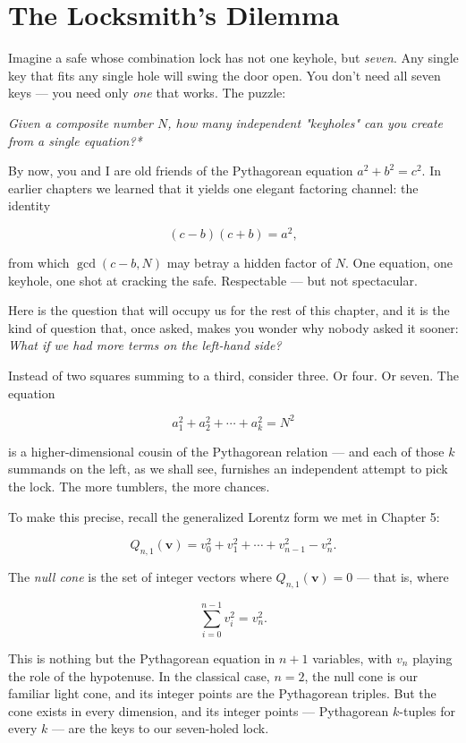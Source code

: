 \documentclass[11pt,openright,twoside]{book}
\renewenvironment{quotation}{%
  \par\vspace{8pt}%
  \begin{list}{}{%
    \setlength{\leftmargin}{2em}%
    \setlength{\rightmargin}{2em}%
  }\item[]\itshape\color{pullquote}%
}{%
  \end{list}%
  \par\vspace{8pt}%
}
\theoremstyle{definition}
\begin{document}
\bigskip


\section{The Locksmith's Dilemma}

Imagine a safe whose combination lock has not one keyhole, but \textit{seven}. Any single key that fits any single hole will swing the door open. You don't need all seven keys --- you need only \textit{one} that works. The puzzle:

\begin{quotation}
\noindent\itshape *Given a composite number $N$, how many independent "keyholes" can you create from a single equation?*
\end{quotation}

By now, you and I are old friends of the Pythagorean equation $a^2 + b^2 = c^2$. In earlier chapters we learned that it yields one elegant factoring channel: the identity

\[(c - b)(c + b) = a^2,\]

from which $\gcd(c - b, N)$ may betray a hidden factor of $N$. One equation, one keyhole, one shot at cracking the safe. Respectable --- but not spectacular.

Here is the question that will occupy us for the rest of this chapter, and it is the kind of question that, once asked, makes you wonder why nobody asked it sooner: \textit{What if we had more terms on the left-hand side?}

Instead of two squares summing to a third, consider three. Or four. Or seven. The equation

\[a_1^2 + a_2^2 + \cdots + a_k^2 = N^2\]

is a higher-dimensional cousin of the Pythagorean relation --- and each of those $k$ summands on the left, as we shall see, furnishes an independent attempt to pick the lock. The more tumblers, the more chances.

To make this precise, recall the generalized Lorentz form we met in Chapter 5:

\[Q_{n,1}(\mathbf{v}) = v_0^2 + v_1^2 + \cdots + v_{n-1}^2 - v_n^2.\]

The \textit{null cone} is the set of integer vectors where $Q_{n,1}(\mathbf{v}) = 0$ --- that is, where

\[\sum_{i=0}^{n-1} v_i^2 = v_n^2.\]

This is nothing but the Pythagorean equation in $n + 1$ variables, with $v_n$ playing the role of the hypotenuse. In the classical case, $n = 2$, the null cone is our familiar light cone, and its integer points are the Pythagorean triples. But the cone exists in every dimension, and its integer points --- Pythagorean $k$-tuples for every $k$ --- are the keys to our seven-holed lock.
\end{document}

